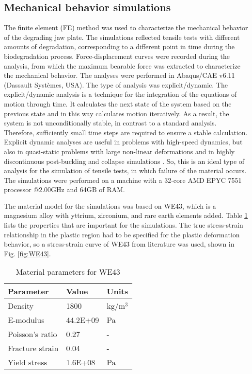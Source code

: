 \subsection{Mechanical behavior simulations}
\label{sec:FEA}

The finite element (FE) method was used to characterize the mechanical behavior of the degrading jaw plate. The simulations reflected tensile tests with different amounts of degradation, corresponding to a different point in time during the biodegradation process. Force-displacement curves were recorded during the analysis, from which the maximum bearable force was extracted to characterize the mechanical behavior. The analyses were performed in Abaqus/CAE v6.11 (Dassault Systèmes, USA). The type of analysis was explicit/dynamic. The explicit/dynamic analysis is a technique for the integration of the equations of motion through time. It calculates the next state of the system based on the previous state and in this way calculates motion iteratively. As a result, the system is not unconditionally stable, in contrast to a standard analysis. Therefore, sufficiently small time steps are required to ensure a stable calculation. Explicit dynamic analyses are useful in problems with high-speed dynamics, but also in quasi-static problems with large non-linear deformations and in highly discontinuous post-buckling and collapse simulations \cite{explicit2}. So, this is an ideal type of analysis for the simulation of tensile tests, in which failure of the material occurs. The simulations were performed on a machine with a 32-core AMD EPYC 7551 processor @2.00GHz and 64GB of RAM.

The material model for the simulations was based on WE43, which is a magnesium alloy with yttrium, zirconium, and rare earth elements added. Table \ref{tab:WE43} lists the properties that are important for the simulations. The true stress-strain relationship in the plastic region had to be specified for the plastic deformation behavior, so a stress-strain curve of WE43 from literature was used, shown in Fig. \ref{fig:WE43}.

\begin{table}[h]
\centering
\begin{tabular}{|l|l|l|}
\hline
\textbf{Parameter} & \textbf{Value} & \textbf{Units}  \\
\hline
Density            & 1800           & kg/m$^3$        \\
\hline
E-modulus          & 44.2E+09       & Pa              \\
\hline
Poisson's ratio    & 0.27           & -               \\
\hline
Fracture strain    & 0.04           & -               \\
\hline
Yield stress       & 1.6E+08        & Pa              \\
\hline
\end{tabular}
\caption{Material parameters for WE43}
\label{tab:WE43}
\end{table}

